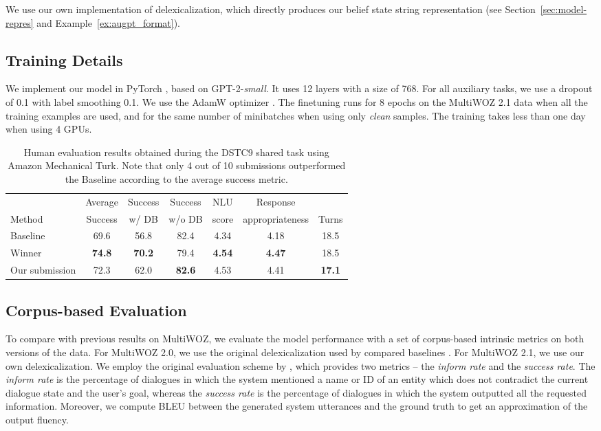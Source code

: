\documentclass[11pt]{article}
\newcommand{\exampleref}[1]{Example~\ref{#1}}
\newcommand{\multiwozn}[0]{MultiWOZ 2.1\xspace}
\begin{document}
We use our own implementation of delexicalization, which directly produces our belief state string representation (see Section~\ref{sec:model-repres} and \exampleref{ex:augpt_format}).

\subsection{Training Details}

We implement our model in PyTorch \cite{pytorch}, based on GPT-2-\emph{small}.
It uses 12 layers with a size of 768.
For all auxiliary tasks, we use a dropout of 0.1 with label smoothing 0.1.
We use the AdamW optimizer \cite{loshchilov2017decoupled}.
The finetuning runs for 8 epochs on the \multiwozn data when all the training examples are used, and for the same number of minibatches when using only \emph{clean} samples.
The training takes less than one day when using 4 GPUs.

\begin{table*}[t]
    \centering\small
    \begin{tabular}{lcccccc}
      \toprule
      & Average & Success & Success  & NLU &  Response & \\
      Method & Success & w/ DB & w/o DB & score & appropriateness & Turns \\
      \midrule
      Baseline & 69.6 & 56.8 & 82.4 & 4.34 & 4.18 & 18.5 \\
      Winner & \textbf{74.8} & \textbf{70.2} & 79.4 & \textbf{4.54 }& \textbf{4.47} & 18.5 \\
      Our submission & 72.3 & 62.0 & \textbf{82.6} & 4.53 & 4.41 & \textbf{17.1} \\
      \bottomrule
    \end{tabular}
    \caption{Human evaluation results obtained during the DSTC9 shared task using Amazon Mechanical Turk. Note that only 4 out of 10 submissions outperformed the Baseline according to the average success metric.}
    \label{tab:human}
\end{table*}

\subsection{Corpus-based Evaluation}
\label{sec:corpus-based}

To compare with previous results on MultiWOZ, we evaluate the model performance with a set of corpus-based intrinsic metrics on both versions of the data.
For MultiWOZ 2.0, we use the original delexicalization used by compared baselines \cite{peng2020,hosseini2020,zhang2019}. For MultiWOZ 2.1, we use our own delexicalization.
We employ the original evaluation scheme by \citet{budzianowski2018}, which provides two metrics -- the \emph{inform rate} and the \emph{success rate}. 
The \emph{inform rate} is the percentage of dialogues in which the system mentioned a name or ID of an entity which does not contradict the current dialogue state and the user's goal, whereas the \emph{success rate} is the percentage of dialogues in which the system outputted all the requested information. 
Moreover, we compute BLEU \cite{papineni2002} between the generated system utterances and the ground truth to get an approximation of the output fluency.
\end{document}
